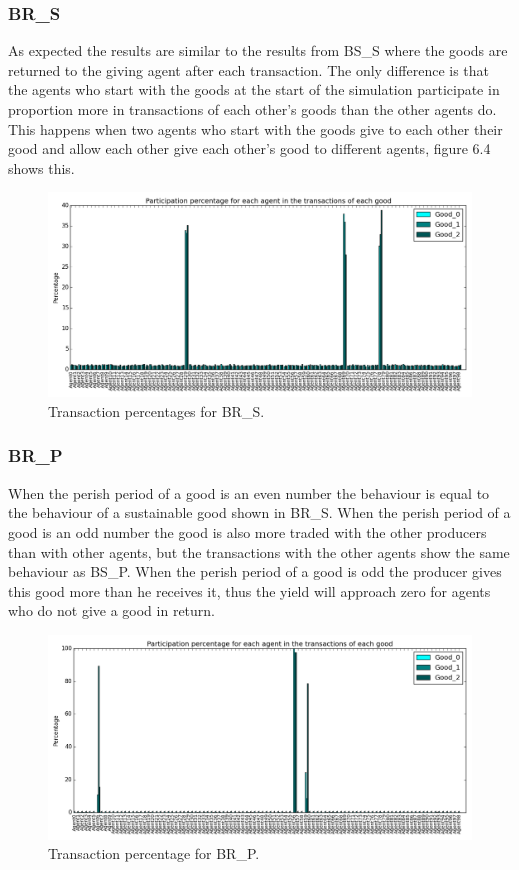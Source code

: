 \documentclass[twoside,openright]{uva-bachelor-thesis}
\begin{document}
\subsubsection{BR\_S} 
As expected the results are similar to the results from BS\_S where the goods are returned to the giving agent after each transaction. The only difference is that the agents who start with the goods at the start of the simulation participate in proportion more in transactions of each other’s goods than the other agents do. This happens when two agents who start with the goods give to each other their good and allow each other give each other’s good to different agents, figure 6.4 shows this. \\
\begin{figure}[h!]
\centering
\includegraphics[scale=0.4]{Simulation_figures/BR_S/Figure1_30k}
\caption{Transaction percentages for BR\_S.}
\end{figure}
\newpage


\subsubsection{BR\_P}
When the perish period of a good is an even number the behaviour is equal to the behaviour of a sustainable good shown in BR\_S. When the perish period of a good is an odd number the good is also more traded with the other producers than with other agents, but the transactions with the other agents show the same behaviour as BS\_P. When the perish period of a good is odd the producer gives this good more than he receives it, thus the yield will approach zero for agents who do not give a good in return.
\begin{figure}[h!]
\centering
\includegraphics[scale=0.4]{Simulation_figures/BR_P/Figure1_10k}
\caption{Transaction percentage for BR\_P.}
\end{figure}
\end{document}
